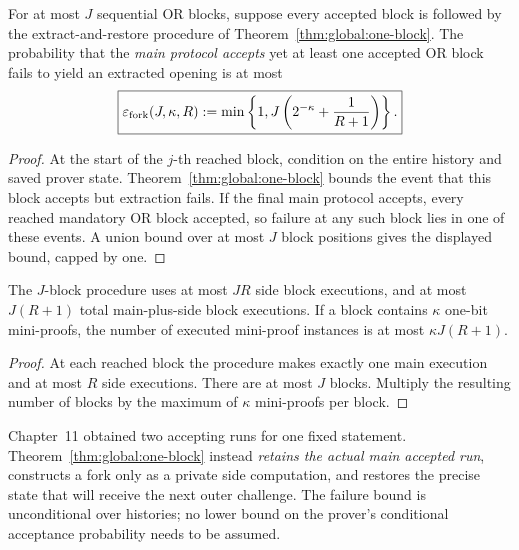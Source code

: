 \begin{corollary}\label{cor:global:J-blocks}
For at most $J$ sequential OR blocks,
suppose every accepted block is followed
by the extract-and-restore procedure of
Theorem~\ref{thm:global:one-block}.
The probability that the \emph{main
protocol accepts} yet at least one
accepted OR block fails to yield an
extracted opening is at most
\[
 \boxed{
 \varepsilon_{\rm fork}(J,\kappa,R)
 :=\min\left\{1,
 J\left(2^{-\kappa}+\frac1{R+1}\right)\right\}.}
\]
\end{corollary}
\begin{proof}
At the start of the $j$-th reached
block, condition on the entire
history and saved prover state.
Theorem~\ref{thm:global:one-block}
bounds the event that this block
accepts but extraction fails.
If the final main protocol accepts,
every reached mandatory OR block
accepted, so failure at any such
block lies in one of these events.
A union bound over at most $J$
block positions gives the displayed
bound, capped by one.
\end{proof}

\begin{lemma}\label{lem:global:runtime}
The $J$-block procedure uses at most
$JR$ side block executions,
and at most $J(R+1)$ total
main-plus-side block executions.
If a block contains $\kappa$
one-bit mini-proofs, the number
of executed mini-proof instances
is at most $\kappa J(R+1)$.
\end{lemma}
\begin{proof}
At each reached block the procedure
makes exactly one main execution
and at most $R$ side executions.
There are at most $J$ blocks.
Multiply the resulting number
of blocks by the maximum of
$\kappa$ mini-proofs per block.
\end{proof}

\begin{remark}
Chapter~11 obtained two accepting
runs for one fixed statement.
Theorem~\ref{thm:global:one-block}
instead \emph{retains the actual main
accepted run}, constructs a fork only
as a private side computation, and
restores the precise state that will
receive the next outer challenge.
The failure bound is unconditional
over histories; no lower bound on
the prover's conditional acceptance
probability needs to be assumed.
\end{remark}
